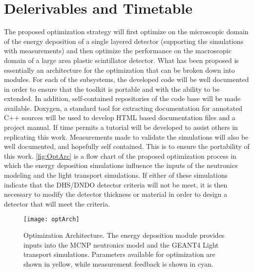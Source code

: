 \section{Delerivables and Timetable} 
The proposed optimization strategy will first optimize on the microscopic domain of the energy deposition of a single layered detector (supporting the simulations with measurements) and then optimize the performance on the macroscopic domain of a large area plastic scintillator detector.
What has been proposed is essentially an architecture for the optimization that can be broken down into modules.
For each of the subsystems, the developed code will be well documented in order to ensure that the toolkit is portable and with the ability to be extended.
In addition, self-contained repositories of the code base will be made available.
Doxygen, a standard tool for extracting documentation for annotated C++ sources will be used to develop HTML based documentation files and a project manual.
If time permits a tutorial will be developed to assist others in replicating this work.
Measurements made to validate the simulations will also be well documented, and hopefully self contained.
This is to ensure the portability of this work.
\autoref{fig:OptArc} is a flow chart of the proposed optimization process in which the energy deposition simulations influence the inputs of the neutronics modeling and the light transport simulations.
If either of these simulations indicate that the DHS/DNDO detector criteria will not be meet, it is then necessary to modify the detector thickness or material in order to design a detector that will meet the criteria. 
\begin{figure}
  \centering
  \texttt{[image: optArch]}
  \caption[Optimization Architecture]{Optimization Architecture.  The energy deposition module provides inputs into the MCNP neutronics model and the GEANT4 Light transport simulations. Parameters available for optimization are shown in yellow, while measurement feedback is shown in cyan.}
  \label{fig:OptArc}
\end{figure}

